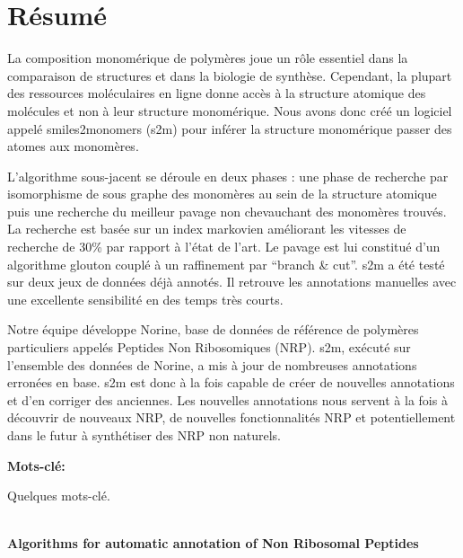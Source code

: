 \documentclass[12pt]{LHSV_thesis}
\begin{document}
\section*{\Huge Résumé}
%
\vspace{2cm}

La composition monomérique de polymères joue un rôle essentiel dans la comparaison de structures et dans la biologie de synthèse.
Cependant, la plupart des ressources moléculaires en ligne donne accès à la structure atomique des molécules et non à leur structure monomérique.
Nous avons donc créé un logiciel appelé smiles2monomers (s2m) pour inférer la structure monomérique passer des atomes aux monomères.

L'algorithme sous-jacent se déroule en deux phases : une phase de recherche par isomorphisme de sous graphe des monomères au sein de la structure atomique puis une recherche du meilleur pavage non chevauchant des monomères trouvés.
La recherche est basée sur un index markovien améliorant les vitesses de recherche de 30\% par rapport à l'état de l'art.
Le pavage est lui constitué d'un algorithme glouton couplé à un raffinement par ``branch \& cut''.
s2m a été testé sur deux jeux de données déjà annotés.
Il retrouve les annotations manuelles avec une excellente sensibilité en des temps très courts.

Notre équipe développe Norine, base de données de référence de polymères particuliers appelés Peptides Non Ribosomiques (NRP).
s2m, exécuté sur l'ensemble des données de Norine, a mis à jour de nombreuses annotations erronées en base.
s2m est donc à la fois capable de créer de nouvelles annotations et d'en corriger des anciennes.
Les nouvelles annotations nous servent à la fois à découvrir de nouveaux NRP, de nouvelles fonctionnalités NRP et potentiellement dans le futur à synthétiser des NRP non naturels.


\vspace*{28pt}\par
\textbf{Mots-clé:}\par
Quelques mots-clé.
\par
\clearpage

\begin{center}
~\vspace{6.0cm}\\
\thispagestyle{plain}
\Huge \textbf{Algorithms for automatic annotation of Non Ribosomal Peptides}
\vspace*{\fill}
\clearpage
\end{center}
\end{document}
